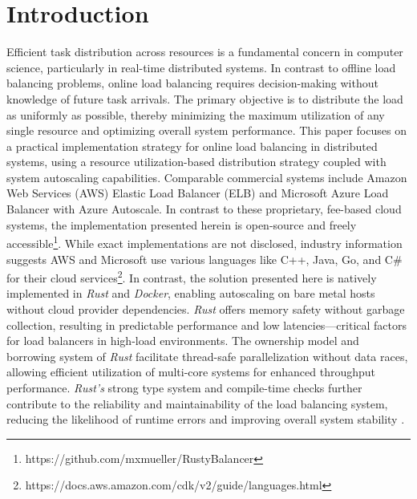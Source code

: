 \documentclass[twocolumn]{webofc}
\begin{document}
\section{Introduction}
Efficient task distribution across resources is a fundamental concern in computer science, particularly in real-time distributed systems. In contrast to offline load balancing problems, online load balancing requires decision-making without knowledge of future task arrivals. The primary objective is to distribute the load as uniformly as possible, thereby minimizing the maximum utilization of any single resource and optimizing overall system performance.
This paper focuses on a practical implementation strategy for online load balancing in distributed systems, using a resource utilization-based distribution strategy coupled with system autoscaling capabilities. Comparable commercial systems include Amazon Web Services (AWS) Elastic Load Balancer (ELB)\cite{aws_load_balancing} and Microsoft Azure Load Balancer with Azure Autoscale\cite{azure_autoscale_overview}. In contrast to these proprietary, fee-based cloud systems, the implementation presented herein is open-source and freely accessible\footnote{https://github.com/mxmueller/RustyBalancer}. While exact implementations are not disclosed, industry information suggests AWS and Microsoft use various languages like C++, Java, Go, and C\# for their cloud services\footnote{https://docs.aws.amazon.com/cdk/v2/guide/languages.html}.
In contrast, the solution presented here is natively implemented in \textit{Rust} and \textit{Docker}, enabling autoscaling on bare metal hosts without cloud provider dependencies. \textit{Rust} offers memory safety without garbage collection, resulting in predictable performance and low latencies—critical factors for load balancers in high-load environments. The ownership model and borrowing system of \textit{Rust} facilitate thread-safe parallelization without data races, allowing efficient utilization of multi-core systems for enhanced throughput performance. \textit{Rust's} strong type system and compile-time checks further contribute to the reliability and maintainability of the load balancing system, reducing the likelihood of runtime errors and improving overall system stability \cite{klabnik2019rust}.
\end{document}
